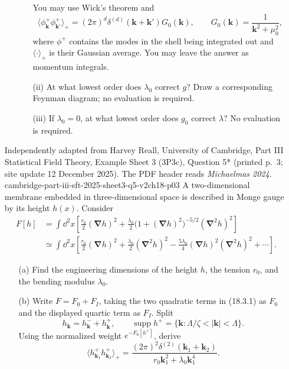 \begin{enumerate}
\begin{enumerate}
\begin{enumerate}
      You may use Wick's theorem and
      \[
        \bigl\langle\phi_{\mathbf k}^{+}
          \phi_{\mathbf k'}^{+}\bigr\rangle_{+}
        =(2\pi)^d\delta^{(d)}(\mathbf k+\mathbf k')G_0(\mathbf k),
        \qquad
        G_0(\mathbf k)=\frac{1}{\mathbf k^2+\mu_0^2},
      \]
      where \(\phi^+\) contains the modes in the shell being integrated
      out and \(\langle\cdot\rangle_+\) is their Gaussian average.  You may
      leave the answer as momentum integrals.
      \item[(ii)] At what lowest order does \(\lambda_0\) correct \(g\)?
      Draw a corresponding Feynman diagram; no evaluation is required.
      \item[(iii)] If \(\lambda_0=0\), at what lowest order does \(g_0\)
      correct \(\lambda\)?  No evaluation is required.
    \end{enumerate}
  \end{enumerate}

  {Independently adapted from Harvey Reall, University of Cambridge,
  Part III Statistical Field Theory, Example Sheet 3 (3P3c), Question 5*
  (printed p.~3; site update 12 December 2025).  The PDF header reads
  \emph{Michaelmas 2024}.}
  {cambridge-part-iii-sft-2025-sheet3-q5-v2ch18-p03}
  A two-dimensional membrane embedded in three-dimensional space is described
  in Monge gauge by its height \(h(x)\).  Consider
  \[
    \begin{split}
      F[h]
      &=\int \dd^2x\left[
        \frac{r_0}{2}(\boldsymbol\nabla h)^2
        +\frac{\lambda_0}{2}
          \bigl(1+(\boldsymbol\nabla h)^2\bigr)^{-5/2}
          (\boldsymbol\nabla^2h)^2
      \right]\\
      &\simeq\int \dd^2x\left[
        \frac{r_0}{2}(\boldsymbol\nabla h)^2
        +\frac{\lambda_0}{2}(\boldsymbol\nabla^2h)^2
        -\frac{5\lambda_0}{4}
          (\boldsymbol\nabla h)^2(\boldsymbol\nabla^2h)^2
        +\cdots
      \right].
    \end{split}
    \tag{18.3.1}
  \]
  \begin{enumerate}
    \item[(a)]
    Find the engineering dimensions of the height \(h\), the tension \(r_0\),
    and the bending modulus \(\lambda_0\).

    \item[(b)]
    Write \(F=F_0+F_I\), taking the two quadratic terms in (18.3.1) as
    \(F_0\) and the displayed quartic term as \(F_I\).  Split
    \[
      h_{\mathbf k}=h_{\mathbf k}^-+h_{\mathbf k}^+,
      \qquad
      \operatorname{supp}h^+
      =\{\mathbf k:\Lambda/\zeta<|\mathbf k|<\Lambda\}.
      \tag{18.3.2}
    \]
    Using the normalized weight \(e^{-F_0[h^+]}\), derive
    \[
      \bigl\langle h_{\mathbf k_1}^+h_{\mathbf k_2}^+\bigr\rangle_+
      =\frac{(2\pi)^2\delta^{(2)}
        (\mathbf k_1+\mathbf k_2)}
        {r_0\mathbf k_1^2+\lambda_0\mathbf k_1^4}.
      \tag{18.3.3}
    \]


\end{enumerate}
\end{enumerate}
